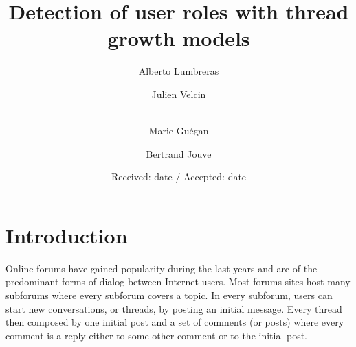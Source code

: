 \documentclass[smallextended]{svjour3}          %
\begin{document}
\title{Detection of user roles with thread growth models}

\author{Alberto Lumbreras \and
        Julien Velcin  \and\\
        Marie Guégan \and
        Bertrand Jouve
}



\date{Received: date / Accepted: date}

\maketitle


\section{Introduction}

Online forums have gained popularity during the last years and are of the predominant forms of dialog between Internet users. Most forums sites host many subforums where every subforum covers a topic. In every subforum, users can start new conversations, or threads, by posting an initial message. Every thread then composed by one initial post and a set of comments (or posts) where every comment is a reply either to some other comment or to the initial post. 
\end{document}
